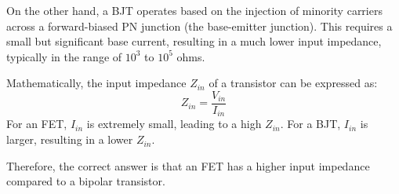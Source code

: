 On the other hand, a BJT operates based on the injection of minority carriers across a forward-biased PN junction (the base-emitter junction). This requires a small but significant base current, resulting in a much lower input impedance, typically in the range of \(10^3\) to \(10^5\) ohms.

Mathematically, the input impedance \(Z_{in}\) of a transistor can be expressed as:
\[
Z_{in} = \frac{V_{in}}{I_{in}}
\]
For an FET, \(I_{in}\) is extremely small, leading to a high \(Z_{in}\). For a BJT, \(I_{in}\) is larger, resulting in a lower \(Z_{in}\).

Therefore, the correct answer is that an FET has a higher input impedance compared to a bipolar transistor.

